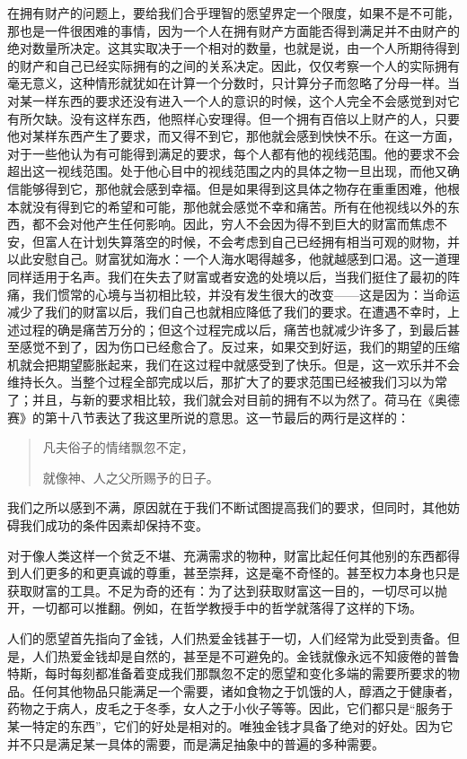\documentclass[12pt,oneside]{book}
\begin{document}
在拥有财产的问题上，要给我们合乎理智的愿望界定一个限度，如果不是不可能，那也是一件很困难的事情，因为一个人在拥有财产方面能否得到满足并不由财产的绝对数量所决定。这其实取决于一个相对的数量，也就是说，由一个人所期待得到的财产和自己已经实际拥有的之间的关系决定。因此，仅仅考察一个人的实际拥有毫无意义，这种情形就犹如在计算一个分数时，只计算分子而忽略了分母一样。当对某一样东西的要求还没有进入一个人的意识的时候，这个人完全不会感觉到对它有所欠缺。没有这样东西，他照样心安理得。但一个拥有百倍以上财产的人，只要他对某样东西产生了要求，而又得不到它，那他就会感到怏怏不乐。在这一方面，对于一些他认为有可能得到满足的要求，每个人都有他的视线范围。他的要求不会超出这一视线范围。处于他心目中的视线范围之内的具体之物一旦出现，而他又确信能够得到它，那他就会感到幸福。但是如果得到这具体之物存在重重困难，他根本就没有得到它的希望和可能，那他就会感觉不幸和痛苦。所有在他视线以外的东西，都不会对他产生任何影响。因此，穷人不会因为得不到巨大的财富而焦虑不安，但富人在计划失算落空的时候，不会考虑到自己已经拥有相当可观的财物，并以此安慰自己。财富犹如海水：一个人海水喝得越多，他就越感到口渴。这一道理同样适用于名声。我们在失去了财富或者安逸的处境以后，当我们挺住了最初的阵痛，我们惯常的心境与当初相比较，并没有发生很大的改变——这是因为：当命运减少了我们的财富以后，我们自己也就相应降低了我们的要求。在遭遇不幸时，上述过程的确是痛苦万分的；但这个过程完成以后，痛苦也就减少许多了，到最后甚至感觉不到了，因为伤口已经愈合了。反过来，如果交到好运，我们的期望的压缩机就会把期望膨胀起来，我们在这过程中就感受到了快乐。但是，这一欢乐并不会维持长久。当整个过程全部完成以后，那扩大了的要求范围已经被我们习以为常了；并且，与新的要求相比较，我们就会对目前的拥有不以为然了。荷马在《奥德赛》的第十八节表达了我这里所说的意思。这一节最后的两行是这样的： 


\begin{quotation}
凡夫俗子的情绪飘忽不定，

就像神、人之父所赐予的日子。 
\end{quotation}
 

我们之所以感到不满，原因就在于我们不断试图提高我们的要求，但同时，其他妨碍我们成功的条件因素却保持不变。 

对于像人类这样一个贫乏不堪、充满需求的物种，财富比起任何其他别的东西都得到人们更多的和更真诚的尊重，甚至崇拜，这是毫不奇怪的。甚至权力本身也只是获取财富的工具。不足为奇的还有：为了达到获取财富这一目的，一切尽可以抛开，一切都可以推翻。例如，在哲学教授手中的哲学就落得了这样的下场。 

人们的愿望首先指向了金钱，人们热爱金钱甚于一切，人们经常为此受到责备。但是，人们热爱金钱却是自然的，甚至是不可避免的。金钱就像永远不知疲倦的普鲁特斯，每时每刻都准备着变成我们那飘忽不定的愿望和变化多端的需要所要求的物品。任何其他物品只能满足一个需要，诸如食物之于饥饿的人，醇酒之于健康者，药物之于病人，皮毛之于冬季，女人之于小伙子等等。因此，它们都只是“服务于某一特定的东西”，它们的好处是相对的。唯独金钱才具备了绝对的好处。因为它并不只是满足某一具体的需要，而是满足抽象中的普遍的多种需要。 
\end{document}
